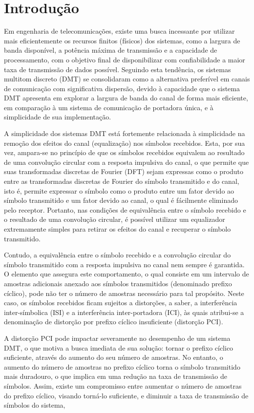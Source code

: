 
\chapter{Introdução}

Em engenharia de telecomunicações, existe uma busca incessante por utilizar mais eficientemente os recursos finitos (físicos) dos sistemas, como a largura de banda disponível, a potência máxima de transmissão e a capacidade de processamento, com o objetivo final de disponibilizar com confiabilidade a maior taxa de transmissão de dados possível. Seguindo esta tendência, os sistemas multitom discreto (DMT) se consolidaram como a alternativa preferível em canais de comunicação com significativa dispersão, devido à capacidade que o sistema DMT apresenta em explorar a largura de banda do canal de forma mais eficiente, em comparação à um sistema de comunicação de portadora única, e à simplicidade de sua implementação. 

A simplicidade dos sistemas DMT está fortemente relacionada à simplicidade na remoção dos efeitos do canal (equalização) nos símbolos recebidos. Esta, por sua vez, ampara-se no princípio de que os símbolos recebidos equivalem ao resultado de uma convolução circular com a resposta impulsiva do canal, o que permite que suas transformadas discretas de Fourier (DFT) sejam expressas como o produto entre as transformadas discretas de Fourier do símbolo transmitido e do canal, isto é, permite expressar o símbolo como o produto entre um fator devido ao símbolo transmitido e um fator devido ao canal, o qual é fácilmente eliminado pelo receptor. Portanto, nas condições de equivalência entre o símbolo recebido e o resultado de uma convolução circular, é possível utilizar um equalizador extremamente simples para retirar os efeitos do canal e recuperar o símbolo transmitido.

Contudo, a equivalência entre o símbolo recebido e a convolução circular do símbolo transmitido com a resposta impulsiva no canal nem sempre é garantida. O elemento que assegura este comportamento, o qual consiste em um intervalo de amostras adicionais anexado aos símbolos transmitidos (denominado prefixo cíclico), pode não ter o número de amostras necessário para tal propósito. Neste caso, os símbolos recebidos ficam sujeitos a distorções, a saber, a interferência inter-símbolica (ISI) e a interferência inter-portadora (ICI), às quais atribui-se a denominação de distorção por prefixo cíclico insuficiente (distorção PCI).

A distorção PCI pode impactar severamente no desempenho de um sistema DMT, o que motiva a busca imediata de sua solução: tornar o prefixo cíclico suficiente, através do aumento do seu número de amostras. No entanto, o aumento do número de amostras no prefixo cíclico torna o símbolo transmitido mais duradouro, o que implica em uma redução na taxa de transmissão de símbolos. Assim, existe um compromisso entre aumentar o número de amostras do prefixo cíclico, visando torná-lo suficiente, e diminuir a taxa de transmissão de símbolos do sistema, 

